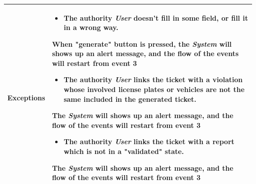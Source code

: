 \begin{table}[H]
\begin{tabular}{|l|p{}|}
\textbf{Exceptions} &    \begin{itemize}
    \item The authority \textit{User} doesn't fill in some field, or fill it in a wrong way.
\end{itemize}

When "generate" button is pressed, the \textit{System} will shows up an alert message, and the flow of the events will restart from event 3

\begin{itemize}
    \item The authority \textit{User} links the ticket with a violation whose involved license plates or vehicles are not the same included in the generated ticket.
\end{itemize}
   The \textit{System} will shows up an alert message, and the flow of the events will restart from event 3
  
\begin{itemize}
    \item The authority \textit{User} links the ticket with a report which is not in a "validated" state.
\end{itemize}
   The \textit{System} will shows up an alert message, and the flow of the events will restart from event 3
                           \\ \hline

\end{tabular}
\end{table}










